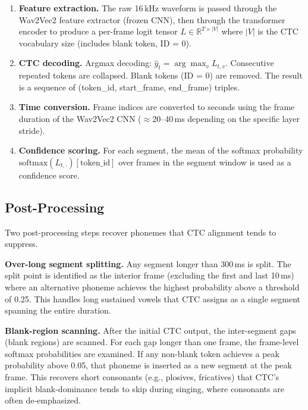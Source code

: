 \documentclass[11pt,letterpaper]{article}
\begin{document}
\begin{enumerate}[noitemsep]
  \item \textbf{Feature extraction.}
        The raw 16\,kHz waveform is passed through the Wav2Vec2 feature
        extractor (frozen CNN), then through the transformer encoder to
        produce a per-frame logit tensor
        $L \in \mathbb{R}^{T \times |V|}$ where $|V|$ is the CTC vocabulary
        size (includes blank token, ID = 0).
  \item \textbf{CTC decoding.}
        Argmax decoding: $\hat{y}_t = \arg\max_v L_{t,v}$.
        Consecutive repeated tokens are collapsed.
        Blank tokens (ID = 0) are removed.
        The result is a sequence of (token\_id, start\_frame, end\_frame)
        triples.
  \item \textbf{Time conversion.}
        Frame indices are converted to seconds using the frame duration of
        the Wav2Vec2 CNN ($\approx$20--40\,ms depending on the specific layer
        stride).
  \item \textbf{Confidence scoring.}
        For each segment, the mean of the softmax probability
        $\mathrm{softmax}(L_{t,\cdot})[\text{token\_id}]$ over frames in
        the segment window is used as a confidence score.
\end{enumerate}

\subsection{Post-Processing}

Two post-processing steps recover phonemes that CTC alignment tends to
suppress.

\textbf{Over-long segment splitting.}
Any segment longer than 300\,ms is split.
The split point is identified as the interior frame (excluding the first and
last 10\,ms) where an alternative phoneme achieves the highest probability
above a threshold of 0.25.
This handles long sustained vowels that CTC assigns as a single segment
spanning the entire duration.

\textbf{Blank-region scanning.}
After the initial CTC output, the inter-segment gaps (blank regions) are
scanned.
For each gap longer than one frame, the frame-level softmax probabilities are
examined.
If any non-blank token achieves a peak probability above 0.05, that phoneme
is inserted as a new segment at the peak frame.
This recovers short consonants (e.g., plosives, fricatives) that CTC's
implicit blank-dominance tends to skip during singing, where consonants are
often de-emphasized.
\end{document}
